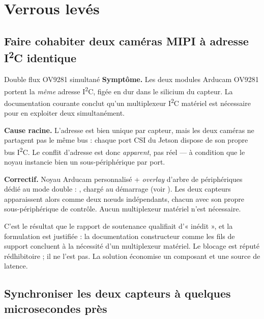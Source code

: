\documentclass[11pt,a4paper]{article}
\begin{document}
\newpage
\section{Verrous levés}

\subsection{Faire cohabiter deux caméras MIPI à adresse I\textsuperscript{2}C identique}

\begin{verroulevé}{Double flux OV9281 simultané}
\textbf{Symptôme.} Les deux modules Arducam OV9281 portent la \emph{même} adresse
I\textsuperscript{2}C, figée en dur dans le silicium du capteur. La documentation
courante conclut qu'un multiplexeur I\textsuperscript{2}C matériel est nécessaire pour en
exploiter deux simultanément.

\textbf{Cause racine.} L'adresse est bien unique par capteur, mais les deux caméras ne
partagent pas le même bus : chaque port CSI du Jetson dispose de son propre bus
I\textsuperscript{2}C. Le conflit d'adresse est donc \emph{apparent}, pas réel — à
condition que le noyau instancie bien un sous-périphérique par port.

\textbf{Correctif.} Noyau Arducam personnalisé + \emph{overlay} d'arbre de périphériques
dédié au mode double :
, chargé au démarrage
(voir ). Les deux capteurs apparaissent alors comme
deux n\oe uds  indépendants, chacun avec son propre sous-périphérique
de contrôle. Aucun multiplexeur matériel n'est nécessaire.
\end{verroulevé}

C'est le résultat que le rapport de soutenance qualifiait d'« inédit », et la formulation est
justifiée : la documentation constructeur comme les fils de support concluent à la nécessité
d'un multiplexeur matériel. Le blocage est réputé rédhibitoire ; il ne l'est pas. La solution
économise un composant et une source de latence.

\subsection{Synchroniser les deux capteurs à quelques microsecondes près}
\end{document}
